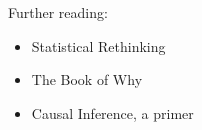 \documentclass[aspectratio=169,xcolor=svgnames]{beamer}
\begin{document}
\begin{frame}
  Further reading:
  \begin{itemize}
  \item Statistical Rethinking
  \item The Book of Why
  \item Causal Inference, a primer
  \end{itemize}
\end{frame}
\end{document}

